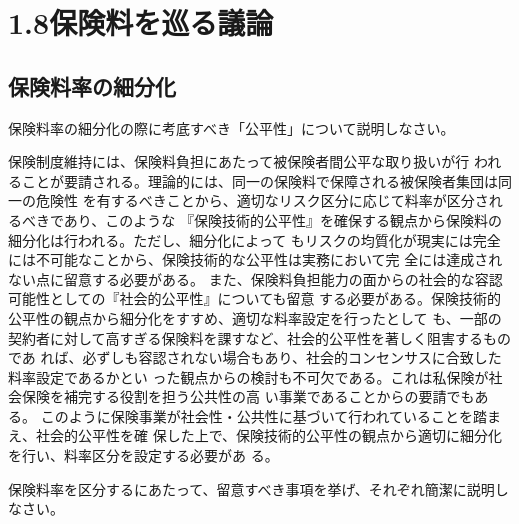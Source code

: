 \documentclass[report,gutter=10mm,fore-edge=10mm,uplatex,dvipdfmx]{jlreq}
\begin{document}
\section{1.8保険料を巡る議論}

\subsection{保険料率の細分化}


保険料率の細分化の際に考底すべき「公平性」について説明しなさい。



  保険制度維持には、保険料負担にあたって被保険者間公平な取り扱いが行
われることが要請される。理論的には、同一の保険料で保障される被保険者集団は同一の危険性
を有するべきことから、適切なリスク区分に応じて料率が区分されるべきであり、このような
『保険技術的公平性』を確保する観点から保険料の細分化は行われる。ただし、細分化によって
もリスクの均質化が現実には完全には不可能なことから、保険技術的な公平性は実務において完
全には達成されない点に留意する必要がある。
また、保険料負担能力の面からの社会的な容認可能性としての『社会的公平性』についても留意
する必要がある。保険技術的公平性の観点から細分化をすすめ、適切な料率設定を行ったとして
も、一部の契約者に対して高すぎる保険料を課すなど、社会的公平性を著しく阻害するものであ
れば、必ずしも容認されない場合もあり、社会的コンセンサスに合致した料率設定であるかとい
った観点からの検討も不可欠である。これは私保険が社会保険を補完する役割を担う公共性の高
い事業であることからの要請でもある。
このように保険事業が社会性・公共性に基づいて行われていることを踏まえ、社会的公平性を確
保した上で、保険技術的公平性の観点から適切に細分化を行い、料率区分を設定する必要があ
る。


保険料率を区分するにあたって、留意すべき事項を挙げ、それぞれ簡潔に説明しなさい。

\end{document}

